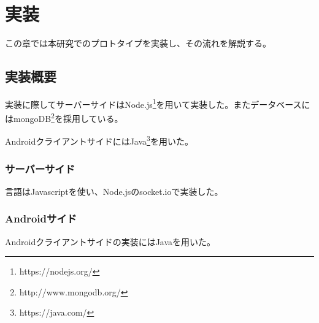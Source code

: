 \chapter{実装}
\label{chap:prototype}

この章では本研究でのプロトタイプを実装し、その流れを解説する。

\section{実装概要}
実装に際してサーバーサイドはNode.js\footnote{https://nodejs.org/}を用いて実装した。またデータベースにはmongoDB\footnote{http://www.mongodb.org/}を採用している。

AndroidクライアントサイドにはJava\footnote{https://java.com/}を用いた。

\subsection{サーバーサイド}
言語はJavascriptを使い、Node.jsのsocket.ioで実装した。

\subsection{Androidサイド}
Androidクライアントサイドの実装にはJavaを用いた。
